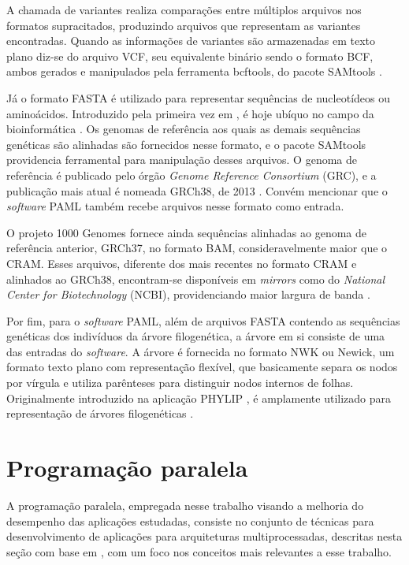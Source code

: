 \documentclass[cic,tc]{iiufrgs}
\begin{document}
A chamada de variantes realiza comparações entre múltiplos arquivos nos
formatos supracitados, produzindo arquivos que representam as variantes
encontradas. Quando as informações de variantes são armazenadas em texto plano
diz-se do arquivo VCF, seu equivalente binário sendo o formato BCF, ambos
gerados e manipulados pela ferramenta bcftools, do pacote
SAMtools \cite{danecek2021twelve}.

Já o formato FASTA é utilizado para representar sequências
de nucleotídeos ou aminoácidos. Introduzido pela primeira vez em
\cite{fasta}, é hoje ubíquo no campo da
bioinformática \cite{shen2016seqkit}. Os genomas de referência aos quais as
demais sequências genéticas são alinhadas são fornecidos nesse formato, e o
pacote SAMtools providencia ferramental para manipulação desses arquivos. O
genoma de referência é publicado pelo órgão \textit{Genome Reference
Consortium} (GRC), e a publicação mais atual é nomeada GRCh38, de
2013 \cite{GUO201783}. Convém mencionar que o \textit{software} PAML também recebe
arquivos nesse formato como entrada.

O projeto 1000 Genomes fornece ainda sequências alinhadas ao genoma de
referência anterior, GRCh37, no formato BAM, consideravelmente maior que o
CRAM. Esses arquivos, diferente dos mais recentes no formato CRAM e alinhados
ao GRCh38, encontram-se disponíveis em \textit{mirrors} como do
\textit{National Center for Biotechnology} (NCBI), providenciando maior largura
de banda \cite{clarke20121000}.

Por fim, para o \textit{software} PAML, além de arquivos FASTA contendo as sequências
genéticas dos indivíduos da árvore filogenética, a árvore em si consiste de uma
das entradas do \textit{software}. A árvore é fornecida no formato NWK ou Newick, um
formato texto plano com representação flexível, que basicamente separa os nodos
por vírgula e utiliza parênteses para distinguir nodos internos de folhas.
Originalmente introduzido na aplicação PHYLIP \cite{felsenstein1993phylip}, é
amplamente utilizado para representação de árvores filogenéticas \cite{fredslund2006phy}.

\section{Programação paralela}
\label{sec:par}

A programação paralela, empregada nesse trabalho visando a melhoria do
desempenho das aplicações estudadas, consiste no conjunto de técnicas para
desenvolvimento de aplicações para arquiteturas multiprocessadas, descritas
nesta seção com base em \cite{el2005advanced}, com um foco nos conceitos mais
relevantes a esse trabalho.
\end{document}
